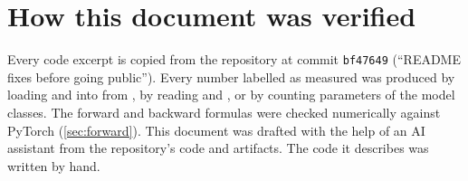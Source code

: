 \section{How this document was verified}

Every code excerpt is copied from the repository at commit \texttt{bf47649} (``README fixes before going public''). Every number labelled as measured was produced by loading  and  into  from , by reading  and , or by counting parameters of the model classes. The forward and backward formulas were checked numerically against PyTorch (\cref{sec:forward}). This document was drafted with the help of an AI assistant from the repository's code and artifacts. The code it describes was written by hand.
